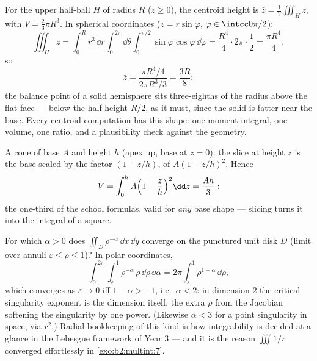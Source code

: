 \begin{example}\label{ex:b2:multint:centroid}
For the upper half-ball $H$ of radius $R$ ($z \geq 0$), the
centroid height is $\bar z = \frac1{V}\iiint_H z$, with $V =
\frac23\pi R^3$. In spherical coordinates ($z =
r\sin\varphi$, $\varphi \in \intcc0{\pi/2}$):
\[
\iiint_H z
= \int_0^R r^3\,\dd r\int_0^{2\pi}\dd\theta
\int_0^{\pi/2}\sin\varphi\cos\varphi\,\dd\varphi
= \frac{R^4}4\cdot2\pi\cdot\frac12 = \frac{\pi R^4}4 ,
\]
so
\[
\bar z = \frac{\pi R^4/4}{2\pi R^3/3} = \frac{3R}8 :
\]
the balance point of a solid hemisphere sits three-eighths of
the radius above the flat face --- below the half-height
$R/2$, as it must, since the solid is fatter near the base.
Every centroid computation has this shape: one moment
integral, one volume, one ratio, and a plausibility check
against the geometry.
\end{example}

\begin{example}\label{ex:b2:multint:cone}
A cone of base  $A$ and height $h$ (apex up, base at $z = 0$):
the slice at height $z$ is the base scaled by the factor $(1 -
z/h)$, of  $A(1 - z/h)^2$. Hence
\[
V = \int_0^h A\Bigl(1 - \frac zh\Bigr)^2\dd z = \frac{Ah}{3} :
\]
the one-third of the school formulas, valid for \emph{any} base
shape --- slicing turns it into the integral of a square.
\end{example}

\begin{example}\label{ex:b2:multint:threshold}
For which $\alpha > 0$ does $\iint_{D}\rho^{-\alpha}\,\dd
x\,\dd y$ converge on the punctured unit disk $D$ (limit
over annuli $\varepsilon \leq \rho \leq 1$)? In polar
coordinates,
\[
\int_0^{2\pi}\!\!\int_\varepsilon^1\rho^{-\alpha}\,
\rho\,\dd\rho\,\dd\alpha
= 2\pi\int_\varepsilon^1\rho^{1-\alpha}\,\dd\rho ,
\]
which converges as $\varepsilon \to 0$ iff $1 - \alpha > -1$,
i.e.\ $\alpha < 2$: in dimension $2$ the critical singularity
exponent is the dimension itself, the extra $\rho$ from the
Jacobian softening the singularity by one power. (Likewise
$\alpha < 3$ for a point singularity in space, via $r^2$.)
Radial bookkeeping of this kind is how integrability is
decided at a glance in the Lebesgue framework of Year 3 ---
and it is the reason $\iiint 1/r$ converged effortlessly in
\cref{exo:b2:multint:7}.
\end{example}

